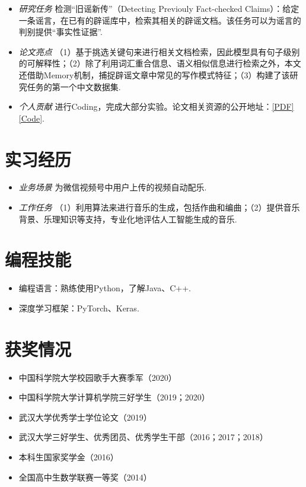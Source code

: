 \documentclass{resume}
\begin{document}
{\small {}}
\small
\begin{itemize}
  \item \textit{研究任务} \quad 检测“旧谣新传”（Detecting Previouly Fact-checked Claims）：给定一条谣言，在已有的辟谣库中，检索其相关的辟谣文档。该任务可以为谣言的判别提供“事实性证据”.
  \item \textit{论文亮点} \quad （1）基于挑选关键句来进行相关文档检索，因此模型具有句子级别的可解释性；（2）除了利用词汇重合信息、语义相似信息进行检索之外，本文还借助Memory机制，捕捉辟谣文章中常见的写作模式特征；（3）构建了该研究任务的第一个中文数据集.
  \item \textit{个人贡献} \quad 进行Coding，完成大部分实验。论文相关资源的公开地址：\href{https://www.zhangxueyao.com/assets/acl2021-memory-paper.pdf}{[PDF]} \href{https://github.com/ICTMCG/MTM}{[Code]}.
\end{itemize}

\section{实习经历}
{\small {}
}
\small
\begin{itemize}
  \item \textit{业务场景} \quad 为微信视频号中用户上传的视频自动配乐.
  \item \textit{工作任务} \quad （1）利用算法来进行音乐的生成，包括作曲和编曲；（2）提供音乐背景、乐理知识等支持，专业化地评估人工智能生成的音乐.
\end{itemize}

\section{编程技能}
\small
\begin{itemize}
  \item 编程语言：熟练使用Python，了解Java、C++.
  \item 深度学习框架：PyTorch、Keras.
\end{itemize}

\section{获奖情况}
\begin{itemize}
  \item 中国科学院大学校园歌手大赛季军（2020）
  \item 中国科学院大学计算机学院三好学生（2019；2020）
  \item 武汉大学优秀学士学位论文（2019）
  \item 武汉大学三好学生、优秀团员、优秀学生干部（2016；2017；2018）
  \item 本科生国家奖学金（2016）
  \item 全国高中生数学联赛一等奖（2014）
\end{itemize}
\end{document}
